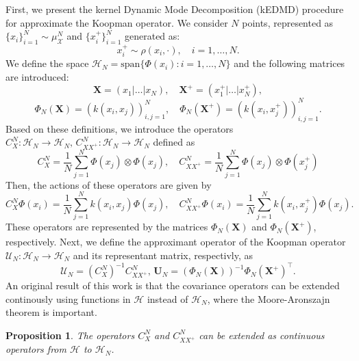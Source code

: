 \documentclass{article}
\newtheorem{prop}{Proposition}
\renewcommand{\H}{\mathcal{H}}
\newcommand{\U}{\mathcal{U}}
\newcommand{\X}{\mathcal{X}}
\begin{document}
First, we present the kernel Dynamic Mode Decomposition (kEDMD) procedure for approximate the Koopman operator. We consider \( N \) points, represented as \( \{ x_i \}_{i=1}^N \sim \mu_\X^N \) and \( \{ x^+_i \}_{i=1}^N \) generated as:
\begin{equation*}
    x^+_i \sim \rho (x_i, \cdot), \quad i = 1, \dots, N.
\end{equation*}
We define the space \(\H_{N} = \text{span} \{\Phi (x_i) : i = 1, \dots, N \}\) and the following matrices are introduced:
\begin{equation*}
    \mathbf{X} = (x_{1} | \dots | x_N), \quad \mathbf{X}^+ = (x_{1}^+ | \dots | x_N^+),
\end{equation*}
\begin{equation*}
    \Phi_N (\mathbf{X}) = (k(x_i, x_j))_{i,j = 1}^N, \quad \Phi_N (\mathbf{X}^+) = (k(x_i, x^+_j))_{i,j = 1}^N.
\end{equation*}
Based on these definitions, we introduce the operators \(C_{X}^N : \H_N \to \H_N, \, C_{XX^+}^N : \H_N \to \H_N\) defined as
\[
C_X^N = \frac{1}{N} \sum_{j=1}^N \Phi (x_j) \otimes \Phi (x_j), \quad C_{XX^+}^N = \frac{1}{N} \sum_{j=1}^N \Phi (x_j) \otimes \Phi (x_j^+)
\]
Then, the actions of these operators are given by
\[
C_{X}^N \Phi (x_i) = \frac{1}{N} \sum_{j = 1}^N k(x_i, x_j) \Phi (x_j), \quad C_{XX^+}^N \Phi (x_i) = \frac{1}{N} \sum_{j = 1}^N k(x_i, x_j^+) \Phi (x_j).
\]
These operators are represented by the matrices \( \Phi_N (\mathbf{X}) \) and \( \Phi_N (\mathbf{X}^+) \), respectively. Next, we define the approximant operator of the Koopman operator \(\U_N : \H_N \to \H_N\) and its representant matrix, respectivly, as
\[
\U_N = (C_X^N)^{-1} C_{XX^+}^N, \, \mathbf{U}_N = (\Phi_N (\mathbf{X}))^{-1} \Phi_N (\mathbf{X}^+)^\top.
\]
An original result of this work is that the covariance operators can be extended continously using functions in $\H$ instead of $\H_N$, where the Moore-Aronszajn theorem is important.
\begin{prop} \label{prop:covariance_ext}
    The operators \( C_X^N \) and \( C_{XX^+}^N \) can be extended as continuous operators from \( \mathcal{H} \) to \( \mathcal{H}_N \).
\end{prop}
\end{document}
